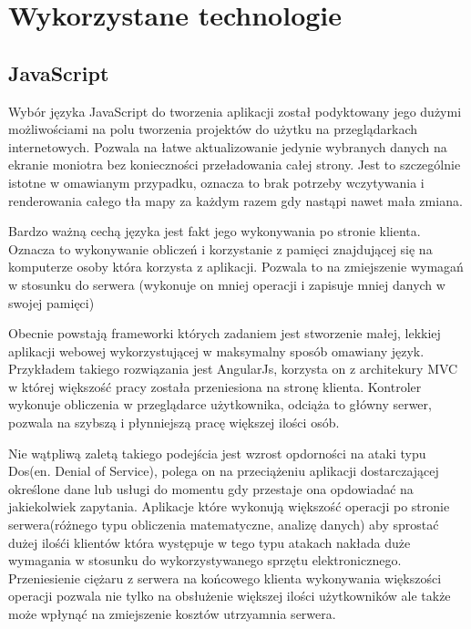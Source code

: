 \section{Wykorzystane technologie}
\label{sec:wykorzystanetechnologie}

\subsection{JavaScript}
\label{sec:javascript}

Wybór języka JavaScript do tworzenia aplikacji został podyktowany jego dużymi możliwościami na polu tworzenia projektów do użytku na przeglądarkach internetowych. Pozwala na łatwe aktualizowanie jedynie wybranych danych na ekranie moniotra bez konieczności przeładowania całej strony. Jest to szczególnie istotne w omawianym przypadku, oznacza to brak potrzeby wczytywania i renderowania całego tła mapy za każdym razem gdy nastąpi nawet mała zmiana.

Bardzo ważną cechą języka jest fakt jego wykonywania po stronie klienta. Oznacza to wykonywanie obliczeń i korzystanie z pamięci znajdującej się na komputerze osoby która korzysta z aplikacji. Pozwala to na zmiejszenie wymagań w stosunku do serwera (wykonuje on mniej operacji i zapisuje mniej danych w swojej pamięci)

Obecnie powstają frameworki których zadaniem jest stworzenie małej, lekkiej aplikacji webowej wykorzystującej w maksymalny sposób omawiany język.\cite{AngularJS} Przykładem takiego rozwiązania jest AngularJs, korzysta on z architekury MVC w której większość pracy została przeniesiona na stronę klienta. Kontroler wykonuje obliczenia w przeglądarce użytkownika, odciąża to główny serwer, pozwala na szybszą i płynniejszą pracę większej ilości osób.

Nie wątpliwą zaletą takiego podejścia jest wzrost opdorności na ataki typu Dos(en. Denial of Service), polega on na przeciążeniu aplikacji dostarczającej określone dane lub usługi do momentu gdy przestaje ona opdowiadać na jakiekolwiek zapytania. Aplikacje które wykonują większość operacji po stronie serwera(różnego typu obliczenia matematyczne, analizę danych) aby sprostać dużej ilośći klientów która występuje w tego typu atakach nakłada duże wymagania w stosunku do wykorzystywanego sprzętu elektronicznego. Przeniesienie ciężaru z serwera na końcowego klienta wykonywania większości operacji pozwala nie tylko na obsłużenie większej ilości użytkowników ale także może wpłynąć na zmiejszenie kosztów utrzyamnia serwera.

